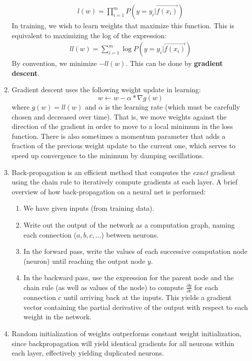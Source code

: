 \documentclass[10pt]{article}
\begin{document}
\begin{multicols}{2}
\begin{addmargin}[0.8em]{0.5em}
\begin{enumerate}[label=(\alph*)]
        \begin{align*}
            l(w) = \prod_{i=1}^m P(y = y_i | \vec{f(x_i)})
        \end{align*}
        In training, we wish to learn weights that maximize this function. This is equivalent to maximizing the log of the expression:
        \begin{align*}
            ll(w) = \sum_{i=1}^m \log P(y = y_i | \vec{f(x_i)})
        \end{align*}
        By convention, we minimize $-ll(w)$. This can be done by \textbf{gradient descent}.
        \item Gradient descent uses the following weight update in learning:
        $$ w \leftarrow w - \alpha * \nabla g(w) $$ where $g(w) = ll(w)$ and $\alpha$ is the learning rate (which must be carefully chosen and decreased over time). That is, we move weights against the direction of the gradient in order to move to a local minimum in the loss function. There is also sometimes a momentum parameter that adds a fraction of the previous weight update to the current one, which serves to speed up convergence to the minimum by damping oscillations.
        \item Back-propagation is an efficient method that computes the \textit{exact} gradient using the chain rule to iteratively compute gradients at each layer.
        A brief overview of how back-propagation on a neural net is performed:
        \begin{enumerate}[label=\roman*.]
            \item We have given inputs (from training data).
            \item Write out the output of the network as a computation graph, naming each connection ($a,b,c,\ldots$) between neurons.
            \item In the forward pass, write the values of each successive computation node (neuron) until reaching the output node $y$. 
            \item In the backward pass, use the expression for the parent node and the chain rule (as well as values of the node) to compute $\frac{\partial y}{\partial c}$ for each connection $c$ until arriving back at the inputs. This yields a gradient vector containing the partial derivative of the output with respect to each weight in the network.
        \end{enumerate}
        \item Random initialization of weights outperforms constant weight initialization, since backpropagation will yield identical gradients for all neurons within each layer, effectively yielding duplicated neurons.

\end{enumerate}
\end{addmargin}
\end{multicols}
\end{document}
